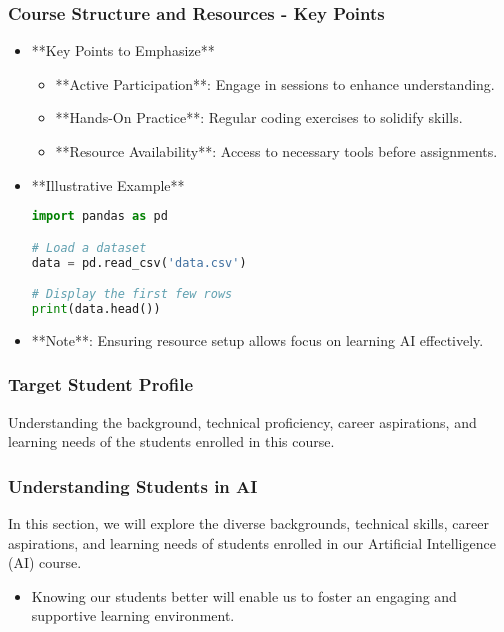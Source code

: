 \documentclass[aspectratio=169]{beamer}
\begin{document}
\begin{frame}[fragile]
    \frametitle{Course Structure and Resources - Key Points}
    \begin{itemize}
        \item **Key Points to Emphasize**
        \begin{itemize}
            \item **Active Participation**: Engage in sessions to enhance understanding.
            \item **Hands-On Practice**: Regular coding exercises to solidify skills.
            \item **Resource Availability**: Access to necessary tools before assignments.
        \end{itemize}
        
        \item **Illustrative Example**
        \begin{lstlisting}[language=Python]
import pandas as pd

# Load a dataset
data = pd.read_csv('data.csv')

# Display the first few rows
print(data.head())
        \end{lstlisting}
        
        \item **Note**: Ensuring resource setup allows focus on learning AI effectively.
    \end{itemize}
\end{frame}

\begin{frame}[fragile]
    \frametitle{Target Student Profile}
    Understanding the background, technical proficiency, career aspirations, and learning needs of the students enrolled in this course.
\end{frame}

\begin{frame}[fragile]
    \frametitle{Understanding Students in AI}
    In this section, we will explore the diverse backgrounds, technical skills, career aspirations, and learning needs of students enrolled in our Artificial Intelligence (AI) course. 
    \begin{itemize}
        \item Knowing our students better will enable us to foster an engaging and supportive learning environment.
    \end{itemize}
\end{frame}
\end{document}
